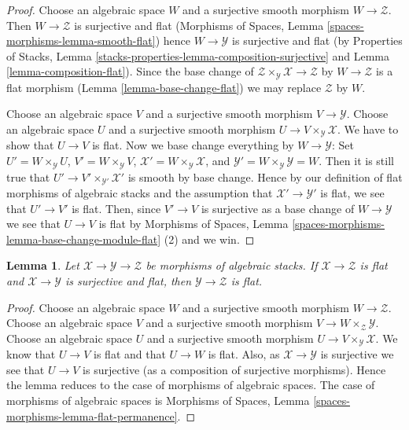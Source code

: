 \documentclass{stacks-project}
\theoremstyle{plain}
\newtheorem{lemma}[subsection]{Lemma}
\theoremstyle{definition}
\theoremstyle{remark}
\numberwithin{equation}{subsection}
\begin{document}
\begin{proof}
Choose an algebraic space $W$ and a surjective smooth morphism
$W \to \mathcal{Z}$. Then $W \to \mathcal{Z}$ is surjective and flat
(Morphisms of Spaces, Lemma \ref{spaces-morphisms-lemma-smooth-flat})
hence $W \to \mathcal{Y}$ is surjective and flat (by
Properties of Stacks, Lemma
\ref{stacks-properties-lemma-composition-surjective}
and
Lemma \ref{lemma-composition-flat}).
Since the base change of
$\mathcal{Z} \times_\mathcal{Y} \mathcal{X} \to \mathcal{Z}$
by $W \to \mathcal{Z}$ is a flat morphism
(Lemma \ref{lemma-base-change-flat})
we may replace $\mathcal{Z}$ by $W$.

\medskip\noindent
Choose an algebraic space $V$ and a surjective smooth morphism
$V \to \mathcal{Y}$. Choose an algebraic space $U$ and a surjective
smooth morphism $U \to V \times_\mathcal{Y} \mathcal{X}$.
We have to show that $U \to V$ is flat. Now we base change
everything by $W \to \mathcal{Y}$: Set $U' = W \times_\mathcal{Y} U$,
$V' = W \times_\mathcal{Y} V$,
$\mathcal{X}' = W \times_\mathcal{Y} \mathcal{X}$,
and $\mathcal{Y}' = W \times_\mathcal{Y} \mathcal{Y} = W$.
Then it is still true that $U' \to V' \times_{\mathcal{Y}'} \mathcal{X}'$
is smooth by base change. Hence by our definition of flat morphisms
of algebraic stacks and the assumption that $\mathcal{X}' \to \mathcal{Y}'$
is flat, we see that $U' \to V'$ is flat. Then, since
$V' \to V$ is surjective as a base change of $W \to \mathcal{Y}$ we see
that $U \to V$ is flat by
Morphisms of Spaces, Lemma
\ref{spaces-morphisms-lemma-base-change-module-flat} (2)
and we win.
\end{proof}

\begin{lemma}
\label{lemma-flat-permanence}
Let $\mathcal{X} \to \mathcal{Y} \to \mathcal{Z}$ be morphisms of
algebraic stacks. If $\mathcal{X} \to \mathcal{Z}$ is flat
and $\mathcal{X} \to \mathcal{Y}$ is surjective and flat, then
$\mathcal{Y} \to \mathcal{Z}$ is flat.
\end{lemma}

\begin{proof}
Choose an algebraic space $W$ and a surjective smooth morphism
$W \to \mathcal{Z}$. Choose an algebraic space $V$ and a surjective smooth
morphism $V \to W \times_\mathcal{Z} \mathcal{Y}$. Choose an algebraic space
$U$ and a surjective smooth morphism $U \to V \times_\mathcal{Y} \mathcal{X}$.
We know that $U \to V$ is flat and that $U \to W$ is flat.
Also, as $\mathcal{X} \to \mathcal{Y}$ is surjective we see that
$U \to V$ is surjective (as a composition of surjective morphisms).
Hence the lemma reduces to the case of morphisms of algebraic spaces.
The case of morphisms of algebraic spaces is
Morphisms of Spaces, Lemma
\ref{spaces-morphisms-lemma-flat-permanence}.
\end{proof}
\end{document}
